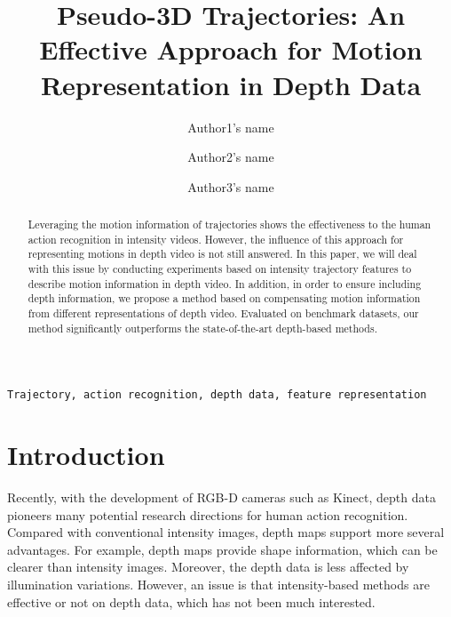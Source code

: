 \documentclass[review]{elsarticle}
\begin{document}
\begin{frontmatter}

\title{Pseudo-3D Trajectories: An Effective Approach for Motion Representation in Depth Data}




\author{Author1's name}
\address{Adress 1}

\author{Author2's name}
\address{Adress 2}

\author{Author3's name}
\address{Adress 3}


\begin{abstract}
Leveraging the motion information of trajectories shows the effectiveness to the human action recognition in intensity videos. However, the influence of this approach for representing motions in depth video is not still answered. In this paper, we will deal with this issue by conducting experiments based on intensity trajectory features to describe motion information in depth video. In addition, in order to ensure including depth information, we propose a method based on compensating motion information from different representations of depth video. Evaluated on benchmark datasets, our method significantly outperforms the state-of-the-art depth-based methods.
\end{abstract}

\begin{keyword}
\texttt{Trajectory, action recognition, depth data, feature representation}
\end{keyword}

\end{frontmatter}

\linenumbers

\section{Introduction}

Recently, with the development of RGB-D cameras such as Kinect, depth data pioneers many potential research directions for human action recognition. Compared with conventional intensity images, depth maps support more several advantages. For example, depth maps provide shape information, which can be clearer than intensity images. Moreover, the depth data is less affected by illumination variations. However, an issue is that intensity-based methods are effective or not on depth data, which has not been much interested.
\end{document}
